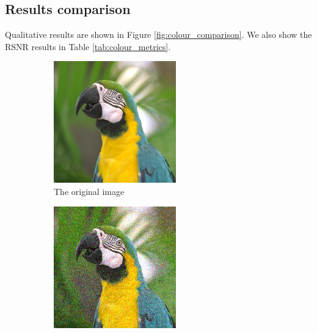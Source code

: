 \documentclass{article}
\begin{document}
\subsection*{Results comparison} \label{sec:results_colour}
Qualitative results are shown in Figure \ref{fig:colour_comparison}. We also show the RSNR results in Table \ref{tab:colour_metrics}.

\begin{figure}[ht]     
    \centering
    \begin{subfigure}[b]{0.24\textwidth}
        \centering
        \includegraphics[width=\textwidth]{../images/colour.png}
        \caption{The original image}
        \label{fig:colour}
    \end{subfigure}
    \begin{subfigure}[b]{0.24\textwidth}
        \centering
        \includegraphics[width=\textwidth]{../images/noisy_colour.png}

\end{subfigure}
\end{figure}
\end{document}
